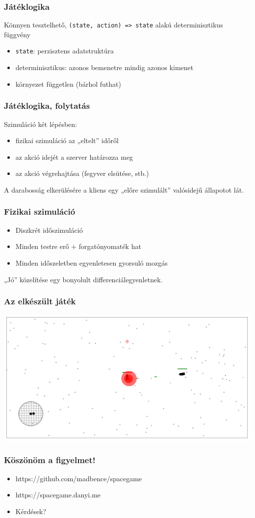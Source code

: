 \documentclass[xetex,14pt]{beamer}
\begin{document}
  \begin{frame}
    \frametitle{Játéklogika}
    Könnyen tesztelhető, \texttt{(state, action) => state} alakú determinisztikus függvény
    \begin{itemize}
      \item \texttt{state}: perzisztens adatstruktúra
      \item determinisztikus: azonos bemenetre mindig azonos kimenet
      \item környezet független (bárhol futhat)
    \end{itemize}
  \end{frame}
  \begin{frame}
    \frametitle{Játéklogika, folytatás}
    Szimuláció két lépésben:
    \begin{itemize}
      \item fizikai szimuláció az „eltelt” időről
      \item az akció idejét a szerver határozza meg
      \item az akció végrehajtása (fegyver elsütése, stb.)
    \end{itemize}
    \vfill
    A darabosság elkerülésére a kliens egy „előre szimulált” valósidejű állapotot lát.
  \end{frame}
  \begin{frame}
    \frametitle{Fizikai szimuláció}
    \begin{itemize}
      \item Diszkrét időszimuláció
      \item Minden testre erő + forgatónyomaték hat
      \item Minden időszeletben egyenletesen gyorsuló mozgás
    \end{itemize}
    „Jó” közelítése egy bonyolult differenciálegyenletnek.
  \end{frame}
  \begin{frame}
    \frametitle{Az elkészült játék}
    \includegraphics[width=\textwidth]{figures/screenshot}
  \end{frame}
  \begin{frame}
    \frametitle{Köszönöm a figyelmet!}
    \begin{itemize}
      \item https://github.com/madbence/spacegame
      \item https://spacegame.danyi.me
      \item Kérdések?
    \end{itemize}
  \end{frame}
\end{document}
